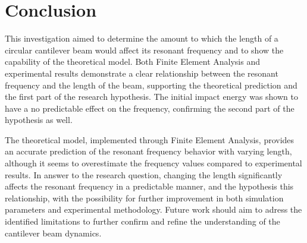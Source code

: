 \documentclass[a4paper,12pt]{article}
\begin{document}
\section{Conclusion}%

This investigation aimed to determine the amount to which the length of a circular cantilever beam would affect its resonant frequency and to show the capability of the theoretical model. Both Finite Element Analysis and experimental results demonstrate a clear relationship between the resonant frequency and the length of the beam, supporting the theoretical prediction and the first part of the research hypothesis.  The initial impact energy was shown to have a no predictable effect on the frequency, confirming the second part of the hypothesis as well.

The theoretical model, implemented through Finite Element Analysis, provides an accurate prediction of the resonant frequency behavior with varying length, although it seems to overestimate the frequency values compared to experimental results. In answer to the research question, changing the length significantly affects the resonant frequency in a predictable manner, and the hypothesis this relationship, with the possibility for further improvement in both simulation parameters and experimental methodology. Future work should aim to adress the identified limitations to further confirm and refine the understanding of the cantilever beam dynamics.

\pagebreak
{}
\printbibliography
\end{document}
